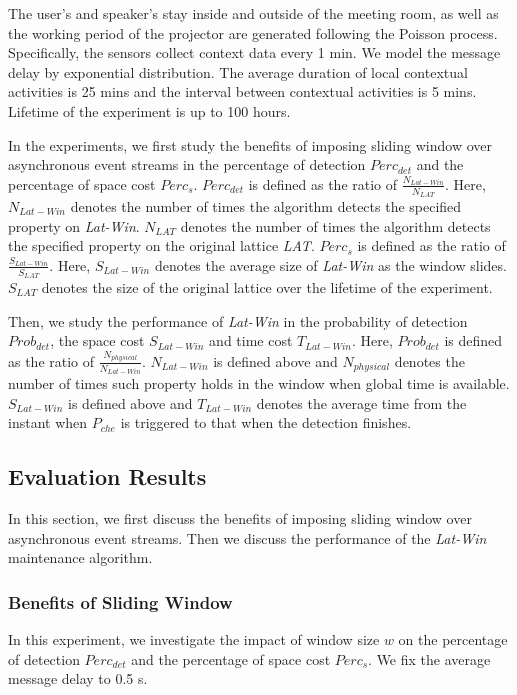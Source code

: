 \documentclass[12pt,journal,letterpaper,compsoc]{IEEEtran}
\begin{document}
The user's and speaker's stay inside and outside of the meeting room, as well as the working period of the projector are generated following the Poisson process. Specifically, the sensors collect context data every 1 min. We model the message delay by exponential distribution. The average duration of local contextual activities is 25 mins and the interval between contextual activities is 5 mins. Lifetime of the experiment is up to 100 hours.

In the experiments, we first study the benefits of imposing sliding window over asynchronous event streams in the percentage of detection $Perc_{det}$ and the percentage of space cost $Perc_{s}$. $Perc_{det}$ is defined as the ratio of $\frac{N_{Lat-Win}}{N_{LAT}}$. Here, $N_{Lat-Win}$ denotes the number of times the algorithm detects the specified property on {\it Lat-Win}. $N_{LAT}$ denotes the number of times the algorithm detects the specified property on the original lattice {\it LAT}. $Perc_{s}$ is defined as the ratio of $\frac{S_{Lat-Win}}{S_{LAT}}$. Here, $S_{Lat-Win}$ denotes the average size of {\it Lat-Win} as the window slides. $S_{LAT}$ denotes the size of the original lattice over the lifetime of the experiment.

Then, we study the performance of {\it Lat-Win} in the probability of detection $Prob_{det}$, the space cost $S_{Lat-Win}$ and time cost $T_{Lat-Win}$. Here, $Prob_{det}$ is defined as the ratio of $\frac{N_{physical}}{N_{Lat-Win}}$. $N_{Lat-Win}$ is defined above and $N_{physical}$ denotes the number of times such property holds in the window when global time is available. $S_{Lat-Win}$ is defined above and $T_{Lat-Win}$ denotes the average time from the instant when $P_{che}$ is triggered to that when the detection finishes.

\subsection{Evaluation Results}

In this section, we first discuss the benefits of imposing sliding window over asynchronous event streams. Then we discuss the performance of the {\it Lat-Win} maintenance algorithm.

\subsubsection{Benefits of Sliding Window}

In this experiment, we investigate the impact of window size $w$ on the percentage of detection $Perc_{det}$ and the percentage of space cost $Perc_{s}$. We fix the average message delay to 0.5 s.
\end{document}
